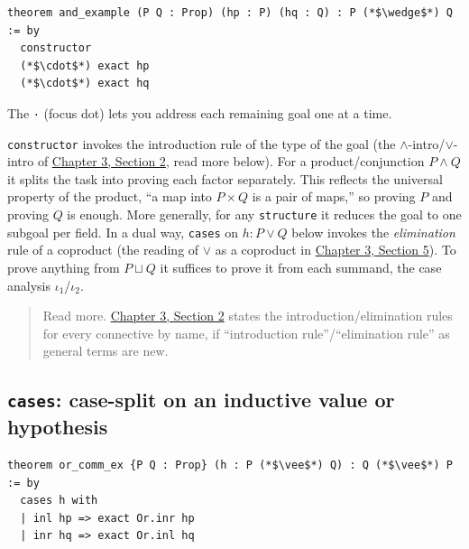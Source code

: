 \begin{lstlisting}
theorem and_example (P Q : Prop) (hp : P) (hq : Q) : P (*$\wedge$*) Q := by
  constructor
  (*$\cdot$*) exact hp
  (*$\cdot$*) exact hq
\end{lstlisting}

The \texttt{·} (focus dot) lets you address each remaining goal one at a time.

\begin{mathreading}

\texttt{constructor} invokes the introduction rule of the type of the goal (the \(\wedge\)-intro/\(\vee\)-intro of \hyperref[sec:03-propositions-and-proofs:02-logic-recap:1]{Chapter 3, Section 2}, read more below). For a product/conjunction \(P \wedge Q\) it splits the task into proving each factor separately. This reflects the universal property of the product, ``a map into \(P \times Q\) is a pair of maps,'' so proving \(P\) and proving \(Q\) is enough. More generally, for any \texttt{structure} it reduces the goal to one subgoal per field. In a dual way, \texttt{cases} on \(h : P \vee Q\) below invokes the \emph{elimination} rule of a coproduct (the reading of \(\vee\) as a coproduct in \hyperref[sec:03-propositions-and-proofs:05-and-or-not:1]{Chapter 3, Section 5}). To prove anything from \(P \sqcup Q\) it suffices to prove it from each summand, the case analysis \(\iota_1\)/\(\iota_2\).

\end{mathreading}

\begin{quote}
Read more. \hyperref[sec:03-propositions-and-proofs:02-logic-recap:1]{Chapter 3, Section 2} states the introduction/elimination rules for every connective by name, if ``introduction rule''/``elimination rule'' as general terms are new.
\end{quote}

\subsection{\texorpdfstring{\texttt{cases}: case-split on an inductive value or hypothesis}{cases: case-split on an inductive value or hypothesis}}\label{sec:04-tactics:04-more-tactics:4}

\begin{lstlisting}
theorem or_comm_ex {P Q : Prop} (h : P (*$\vee$*) Q) : Q (*$\vee$*) P := by
  cases h with
  | inl hp => exact Or.inr hp
  | inr hq => exact Or.inl hq
\end{lstlisting}

